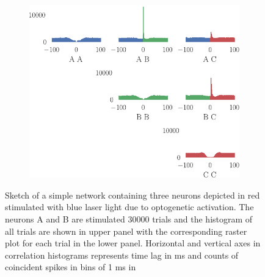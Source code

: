 \documentclass[11pt]{article}
\begin{document}
\begin{figure}
\medskip
\begin{subfigure}{\textwidth}\centering \includegraphics[scale=1]{xcorr}
\caption{} \label{fig:intro:3}
\end{subfigure}
\caption{Sketch of a simple network containing three neurons depicted in red stimulated with blue laser light due to optogenetic activation. The neurons A and B are stimulated 30000 trials and the  histogram of all trials are shown in  upper panel with the corresponding raster plot for each trial in the lower panel. Horizontal and vertical axes in correlation histograms represents time lag in ms and counts of coincident spikes in bins of 1 ms in  \label{fig:intro}}
\end{figure}
\end{document}
